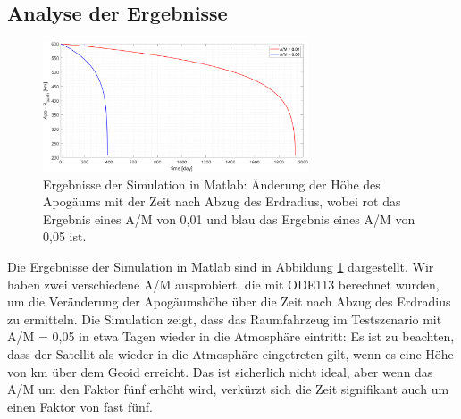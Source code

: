 \subsection{Analyse der Ergebnisse}
\begin{figure}[htbp]
	\centering
	\includegraphics[width=0.7\textwidth]{bilder/Simulation_Matlab.png}
	\caption{Ergebnisse der Simulation in Matlab: Änderung der Höhe des Apogäums mit der Zeit nach Abzug des Erdradius, wobei rot das Ergebnis eines A/M von 0,01 und blau das Ergebnis eines A/M von 0,05 ist.}
	\label{Simulation_Matlab}
\end{figure}
Die Ergebnisse der Simulation in Matlab sind in Abbildung \ref{Simulation_Matlab} dargestellt. Wir haben zwei verschiedene A/M ausprobiert, die mit ODE113 berechnet wurden, um die Veränderung der Apogäumshöhe über die Zeit nach Abzug des Erdradius zu ermitteln. Die Simulation zeigt, dass das Raumfahrzeug im Testszenario mit A/M = 0,05 in etwa \unit[2000]{Tagen} wieder in die Atmosphäre eintritt: Es ist zu beachten, dass der Satellit als wieder in die Atmosphäre eingetreten gilt, wenn es eine Höhe von \unit[150]{km} über dem Geoid erreicht. Das ist sicherlich nicht ideal, aber wenn das A/M um den Faktor fünf erhöht wird, verkürzt sich die Zeit signifikant auch um einen Faktor von fast fünf.

